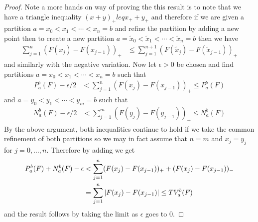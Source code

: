 \begin{proof}
Note a more hands on way of proving the this result is to note
that we have a triangle inequality $(x+y)_+ leq x_+ + y_+$ and therefore
if we are given a partition $a=x_0 < x_1 < \dotsb < x_n=b$ and
refine the partition by adding a new point then to create a new
partition $a=\tilde{x}_0 < \tilde{x}_1 < \dotsb < \tilde{x}_n=b$ then
we have
\begin{align*}
\sum_{j=1}^n (F(x_j) - F(x_{j-1}))_+ &\leq \sum_{j=1}^{n+1} (F(\tilde{x}_j) - F(\tilde{x}_{j-1}))_+
\end{align*}
and similarly with the negative variation.  Now let $\epsilon > 0$ be
chosen and find partitions $a=x_0 < x_1 < \dotsb < x_n=b$ such that 
\begin{align*}
P_a^b(F) - \epsilon/2 &< \sum_{j=1}^n (F(x_j) - F(x_{j-1}))_+  \leq P_a^b(F) 
\end{align*}
and $a=y_0 < y_1 < \dotsb < y_m=b$ such that
\begin{align*}
N_a^b(F) - \epsilon/2 &< \sum_{j=1}^m (F(y_j) - F(y_{j-1}))_+  \leq N_a^b(F) 
\end{align*}
By the above argument, both inequalities continue to hold if we take
the common refinement of both partitions so we may in fact assume that
$n=m$ and $x_j=y_j$ for $j=0, \dotsc, n$.  Therefore by adding we get
\begin{align*}
P_a^b(F)  + N_a^b(F) - \epsilon &< \sum_{j=1}^n  (F(x_j) -
F(x_{j-1}))_+ +  (F(x_j) - F(x_{j-1}))_- \\
&= \sum_{j=1}^n  \left \vert F(x_j) - 
F(x_{j-1}) \right \vert \leq TV_a^b(F)
\end{align*}
and the result follows by taking the limit as $\epsilon$ goes to $0$.
\end{proof}

